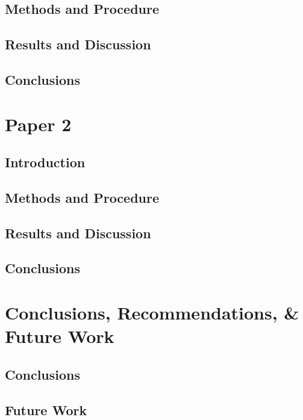   \section{Methods and Procedure}\label{sec:}
    \begin{case}
      \lipsum[10]
    \end{case}
    \begin{case}
      \lipsum[15]
    \end{case}
    \lipsum[46-48]
  \section{Results and Discussion}\label{sec:}
    \lipsum[55-57]
  \section{Conclusions}\label{sec:}
    \lipsum[12-13]
                
\chapter{Paper 2}\label{ch:Paper2}
  \section{Introduction}\label{sec:}
    \lipsum[34-36]
  \section{Methods and Procedure}\label{sec:}
    \lipsum[46-48]
  \section{Results and Discussion}\label{sec:}
    \lipsum[55-57]
  \section{Conclusions}\label{sec:}
    \lipsum[12-13]
                
\chapter{Conclusions, Recommendations, \& Future Work}\label{ch:Conclusions}
  \section{Conclusions}\label{sec:}
    \lipsum[34-36]
  \section{Future Work}\label{sec:}
    \lipsum[38]\cite{TEST}
	
